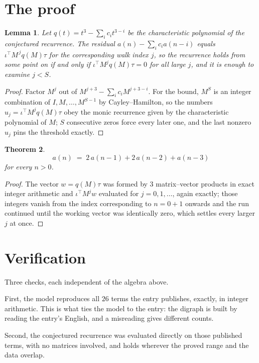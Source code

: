 \documentclass[11pt,a4paper]{article}
\theoremstyle{plain}
\newtheorem{theorem}{Theorem}
\newtheorem{lemma}[theorem]{Lemma}
\theoremstyle{definition}
\begin{document}
\section{The proof}

\begin{lemma}\label{lem:crit}
Let $q(t)=t^{3}-\sum_i c_it^{3-i}$ be the characteristic polynomial of the
conjectured recurrence. The residual $a(n)-\sum_ic_ia(n-i)$ equals
$\iota^{\!\top}M^{\,j}q(M)\tau$ for the corresponding walk index $j$, so the recurrence
holds from some point on if and only if $\iota^{\!\top}M^{j}q(M)\tau=0$ for all large $j$,
and it is enough to examine $j<S$.
\end{lemma}

\begin{proof}
Factor $M^{j}$ out of $M^{j+3}-\sum_ic_iM^{j+3-i}$. For the bound, $M^{S}$
is an integer combination of $I,M,\dots,M^{S-1}$ by Cayley--Hamilton, so the numbers
$u_j=\iota^{\!\top}M^{j}q(M)\tau$ obey the monic recurrence given by the characteristic
polynomial of $M$; $S$ consecutive zeros force every later one, and the last nonzero $u_j$
pins the threshold exactly.
\end{proof}

\begin{theorem}
\[
a(n)\;=\;2\,a(n-1) + 2\,a(n-2) + a(n-3)
\]
for every $n>0$.
\end{theorem}

\begin{proof}
The vector $w=q(M)\tau$ was formed by $3$ matrix--vector products in exact integer
arithmetic and $\iota^{\!\top}M^{j}w$ evaluated for $j=0,1,\dots$, again exactly; those
integers vanish from the index corresponding to $n=0+1$ onwards and the run continued
until the working vector was identically zero, which settles every larger $j$ at once.
\end{proof}

\section{Verification}

Three checks, each independent of the algebra above.

First, the model reproduces all $26$ terms the entry publishes, exactly, in integer
arithmetic. This is what ties the model to the entry: the digraph is built by reading the
entry's English, and a misreading gives different counts.

Second, the conjectured recurrence was evaluated directly on those published terms, with no
matrices involved, and holds wherever the proved range and the data overlap.
\end{document}
